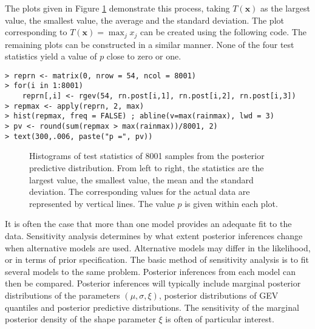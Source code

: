 \documentclass[11pt,a4paper]{article}
\newcommand{\bs}{\boldsymbol}
\begin{document}
The plots given in Figure \ref{diagrainT} demonstrate this process,
taking $T(\bs{x})$ as the largest value, the smallest value, the
average and the standard deviation.  The plot corresponding to
$T(\bs{x}) = \max_j x_j$ can be created using the following code. The
remaining plots can be constructed in a similar manner.  None of the
four test statistics yield a value of $p$ close to zero or one.

\begin{verbatim} 
> reprn <- matrix(0, nrow = 54, ncol = 8001)
> for(i in 1:8001) 
    reprn[,i] <- rgev(54, rn.post[i,1], rn.post[i,2], rn.post[i,3])
> repmax <- apply(reprn, 2, max)
> hist(repmax, freq = FALSE) ; abline(v=max(rainmax), lwd = 3)
> pv <- round(sum(repmax > max(rainmax))/8001, 2)
> text(300,.006, paste("p =", pv))
\end{verbatim}

\begin{figure}
\begin{center}
   \vspace{-1.5cm}
  \hspace{-0.5cm} 
  \hspace{-0.5cm} 
  \hspace{-0.5cm} 
\end{center}
\caption{Histograms of test statistics of 8001 samples from the
  posterior predictive distribution. From left to right, the
  statistics are the largest value, the smallest value, the mean and
  the standard deviation.  The corresponding values for the actual
  data are represented by vertical lines.  The value $p$ is given
  within each plot.}
\label{diagrainT}
\end{figure}

It is often the case that more than one model provides an adequate fit
to the data.  Sensitivity analysis determines by what extent posterior
inferences change when alternative models are used.  Alternative
models may differ in the likelihood, or in terms of prior
specification.  The basic method of sensitivity analysis is to fit
several models to the same problem.  Posterior inferences from each
model can then be compared.  Posterior inferences will typically
include marginal posterior distributions of the parameters
$(\mu,\sigma,\xi)$, posterior distributions of GEV quantiles and
posterior predictive distributions.  The sensitivity of the marginal
posterior density of the shape parameter $\xi$ is often of particular
interest.
\end{document}

